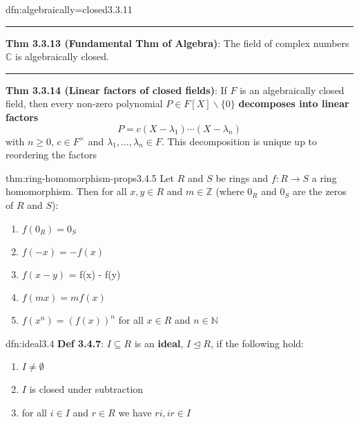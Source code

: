 \documentclass[landscape, 8pt]{extarticle}
\begin{document}
\begin{multicols}{3}
\begin{dfn}{dfn:algebraically=closed}{3.3.11}
    \noindent\rule{\textwidth}{0.2pt}

    \textbf{Thm 3.3.13 (Fundamental Thm of Algebra)}: The field of complex numbers $\mathbb{C}$ is algebraically closed.

    \noindent\rule{\textwidth}{0.2pt}
    \textbf{Thm 3.3.14 (Linear factors of closed fields)}: If $F$ is an algebraically closed field, then every non-zero polynomial $P\in F[X]\backslash \{0\}$ \textbf{decomposes into linear factors}
    \[P = c(X - \lambda_{1}) \cdots (X - \lambda_{n})\]
    with $n\ge 0,\, c\in F^{\times}$ and $\lambda_{1},\dots,\lambda_{n}\in F$. This decomposition is unique up to reordering the factors
\end{dfn}

\begin{thm}{thm:ring-homomorphism-props}{3.4.5}
    Let $R$ and $S$ be rings and $f : R \to S$ a ring homomorphism. Then for all $x,y\in R$ and $m\in \mathbb{Z}$ (where $0_{R}$ and $0_{S}$ are the zeros of $R$ and $S$):

    \vspace{-15pt}
    \begin{multicols}{2}
    \begin{enumerate}
        \setlength\itemsep{0em}
        \item $f(0_{R}) = 0_{S}$
        \item $f(-x) = -f(x)$
        \item $f(x - y)$ = f(x) - f(y)
        \item $f(mx) = mf(x)$
        \item $f(x^{n}) = (f(x))^{n}$ for all $x\in R$ and $n\in \mathbb{N}$
    \end{enumerate}
    \end{multicols}
\end{thm}

\vspace{-5pt}

\begin{dfn}{dfn:ideal}{3.4}
    \textbf{Def 3.4.7}: $I \subseteq R$ is an \textbf{ideal}, $I \unlhd R$, if the following hold:
    \begin{enumerate}
        \setlength\itemsep{0em}
        \item $I \ne \emptyset$
        \item $I$ is closed under subtraction
        \item for all $i\in I$ and $r\in R$ we have $ri, ir\in I$
    \end{enumerate}


\end{dfn}
\end{multicols}
\end{document}
